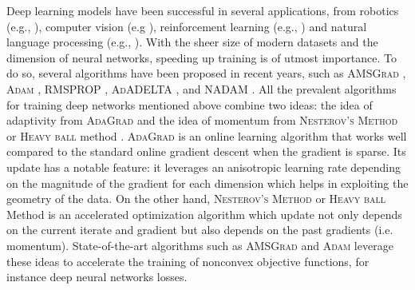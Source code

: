 \documentclass[wcp]{jmlr}
\begin{document}
Deep learning models have been successful in several applications, from robotics (e.g., \citep{LFDA17}), computer vision (e.g \citep{Rnet16,goodfellow2014generative}), reinforcement learning (e.g., \citep{Atari13}) and natural language processing (e.g., \citep{GMH13}).
With the sheer size of modern datasets and the dimension of neural networks, speeding up training is of utmost importance.
To do so, several algorithms have been proposed in recent years, such as  \textsc{AMSGrad} \citep{RKK18}, \textsc{Adam} \citep{KB15}, \textsc{RMSPROP} \citep{TH12}, \textsc{AdADELTA} \citep{Z12}, and \textsc{NADAM} \citep{D16}.
All the prevalent algorithms for training deep networks mentioned above combine two ideas: the idea of adaptivity from \textsc{AdaGrad} \citep{DHS11,MS10} and the idea of momentum from \textsc{Nesterov's Method} \citep{N04} or \textsc{Heavy ball} method \citep{P64}.
\textsc{AdaGrad} is an online learning algorithm that works well compared to the standard online gradient descent when the gradient is sparse.
Its update has a notable feature: it leverages an anisotropic learning rate depending on the magnitude of the gradient for each dimension which helps in exploiting the geometry of the data. 
On the other hand, \textsc{Nesterov's Method} or \textsc{Heavy ball} Method \citep{P64} is an accelerated optimization algorithm which update not only depends on the current iterate and gradient but also depends on the past gradients (i.e. momentum). 
State-of-the-art algorithms such as \textsc{AMSGrad} \citep{RKK18} and \textsc{Adam} \citep{KB15} leverage these ideas to accelerate the training of nonconvex objective functions, for instance deep neural networks losses.
\end{document}
